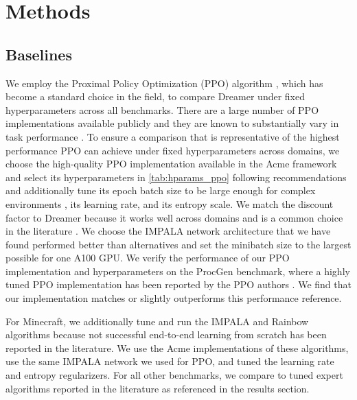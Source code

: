 \clearpage

\section*{Methods}

\subsection*{Baselines}

We employ the Proximal Policy Optimization (PPO) algorithm \citep{schulman2017ppo}, which has become a standard choice in the field, to compare Dreamer under fixed hyperparameters across all benchmarks. There are a large number of PPO implementations available publicly and they are known to substantially vary in task performance \citep{huang2022ppodetails}. To ensure a comparison that is representative of the highest performance PPO can achieve under fixed hyperparameters across domains, we choose the high-quality PPO implementation available in the Acme framework \citep{hoffman2020acme} and select its hyperparameters in \cref{tab:hparams_ppo} following recommendations \citep{huang2022ppodetails,andrychowicz2020whatmatters} and additionally tune its epoch batch size to be large enough for complex environments \cite{cobbe2020procgen}, its learning rate, and its entropy scale. We match the discount factor to Dreamer because it works well across domains and is a common choice in the literature \citep{kapturowski2018r2d2,schrittwieser2019muzero}. We choose the IMPALA network architecture that we have found performed better than alternatives \citep{cobbe2020procgen} and set the minibatch size to the largest possible for one A100 GPU. We verify the performance of our PPO implementation and hyperparameters on the ProcGen benchmark, where a highly tuned PPO implementation has been reported by the PPO authors \citep{cobbe2021ppg}. We find that our implementation matches or slightly outperforms this performance reference.



For Minecraft, we additionally tune and run the IMPALA and Rainbow algorithms because not successful end-to-end learning from scratch has been reported in the literature\citep{guss2019minerl}. We use the Acme implementations\citep{hoffman2020acme} of these algorithms, use the same IMPALA network we used for PPO, and tuned the learning rate and entropy regularizers.
For all other benchmarks, we compare to tuned expert algorithms reported in the literature as referenced in the results section.

